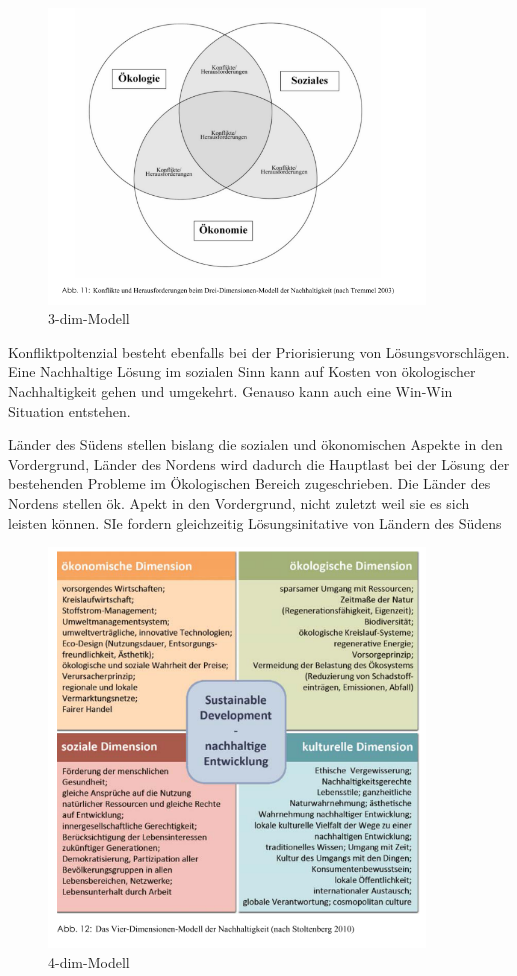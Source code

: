 \documentclass{article}
\begin{document}
\begin{figure}[htp]
\centering
\includegraphics[width=10cm]{image_folder/dreidimensionenmodell_der_N.png}
\caption{3-dim-Modell}
\label{fig:3-dimensionen Modell}
\end{figure}

Konfliktpoltenzial besteht ebenfalls bei der Priorisierung von Lösungsvorschlägen. Eine Nachhaltige Lösung im sozialen Sinn kann auf Kosten von ökologischer Nachhaltigkeit gehen und umgekehrt. Genauso kann auch eine Win-Win Situation entstehen.

Länder des Südens stellen bislang die sozialen und ökonomischen Aspekte in den Vordergrund, Länder des Nordens wird dadurch die Hauptlast bei der Lösung der bestehenden Probleme im Ökologischen Bereich zugeschrieben. Die Länder des Nordens stellen ök. Apekt in den Vordergrund, nicht zuletzt weil sie es sich leisten können. SIe fordern gleichzeitig Lösungsinitative von Ländern des Südens

\begin{figure}[htp]
\centering
\includegraphics[width=10cm]{image_folder/vierdimensionenmodell_der_N.png}
\caption{4-dim-Modell}
\label{fig:4-dimensionen Modell}
\end{figure}
\end{document}

